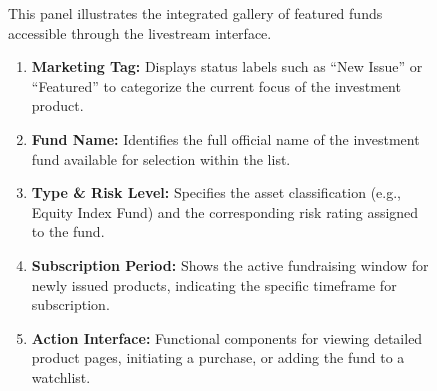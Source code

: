 \begin{landscape}
\begin{figure}[p]
\begin{minipage}[b][\appheight][c]{0.35\textwidth}
    \end{minipage}
    \hfill
    \begin{minipage}[b][\appheight][c]{0.50\textwidth}
        \begin{tcolorbox}[height=\appheight, colback=red!5!white, colframe=red!75!black, 
            title=Product Gallery and Purchase Interface, valign=center, arc=0pt, outer arc=0pt, boxrule=1.5pt]
            \small
            This panel illustrates the integrated gallery of featured funds accessible through the livestream interface.
            \begin{enumerate}[label=\textbf{(\arabic*)}, leftmargin=*, itemsep=4pt, parsep=0pt]
                \item \textbf{Marketing Tag:} Displays status labels such as ``New Issue'' or ``Featured'' to categorize the current focus of the investment product.
                \item \textbf{Fund Name:} Identifies the full official name of the investment fund available for selection within the list.
                \item \textbf{Type \& Risk Level:} Specifies the asset classification (e.g., Equity Index Fund) and the corresponding risk rating assigned to the fund.
                \item \textbf{Subscription Period:} Shows the active fundraising window for newly issued products, indicating the specific timeframe for subscription.
                \item \textbf{Action Interface:} Functional components for viewing detailed product pages, initiating a purchase, or adding the fund to a watchlist.
            \end{enumerate}
        \end{tcolorbox}
    \end{minipage}

    \vspace{10pt}
\end{figure}
\end{landscape}
